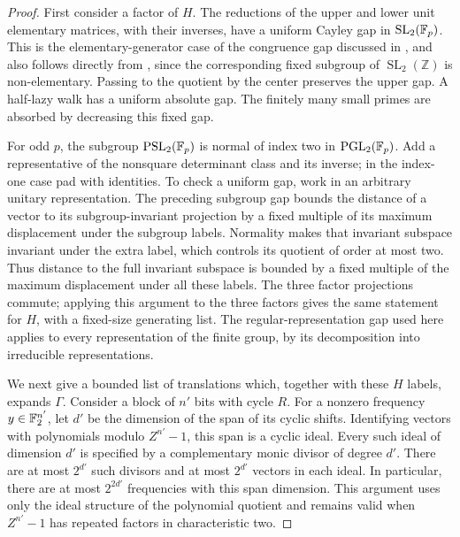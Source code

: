 \begin{proof}
First consider a factor of $H$.  The reductions of the upper and lower
unit elementary matrices, with their inverses, have a uniform Cayley
gap in $\operatorname{SL}_2(\mathbb{F}_p)$.  This is the elementary-generator
case of the congruence gap discussed in \cite[p.~626]{BG2008}, and also
follows directly from \cite[Theorem~1]{BG2008}, since the corresponding
fixed subgroup of $\operatorname{SL}_2(\mathbb Z)$ is non-elementary.
Passing to the quotient by the center preserves the upper gap.  A
half-lazy walk has a uniform absolute gap.  The finitely many small
primes are absorbed by decreasing this fixed gap.

For odd $p$, the subgroup $\operatorname{PSL}_2(\mathbb{F}_p)$ is normal of
index two in $\operatorname{PGL}_2(\mathbb{F}_p)$.  Add a representative of the
nonsquare determinant class and its inverse; in the index-one case pad
with identities.  To check a uniform gap, work in an arbitrary unitary
representation.  The preceding subgroup gap bounds the distance of a
vector to its subgroup-invariant projection by a fixed multiple of its
maximum displacement under the subgroup labels.  Normality makes that
invariant subspace invariant under the extra label, which controls its
quotient of order at most two.  Thus distance to the full invariant
subspace is bounded by a fixed multiple of the maximum displacement
under all these labels.  The three factor projections commute; applying
this argument to the three factors gives the same statement for $H$,
with a fixed-size generating list.  The regular-representation gap used
here applies to every representation of the finite group, by its
decomposition into irreducible representations.

We next give a bounded list of translations which, together with these
$H$ labels, expands $\Gamma$.  Consider a block of $n'$ bits with cycle
$R$.  For a nonzero frequency $y\in\mathbb{F}_2^{n'}$, let $d'$ be the dimension
of the span of its cyclic shifts.  Identifying vectors with polynomials
modulo $Z^{n'}-1$, this span is a cyclic ideal.  Every such ideal of
dimension $d'$ is specified by a complementary monic divisor of degree
$d'$.  There are at most $2^{d'}$ such divisors and at most $2^{d'}$
vectors in each ideal.  In particular, there are at most $2^{2d'}$
frequencies with this span dimension.  This argument uses only the
ideal structure of the polynomial quotient and remains valid when
$Z^{n'}-1$ has repeated factors in characteristic two.


\end{proof}
